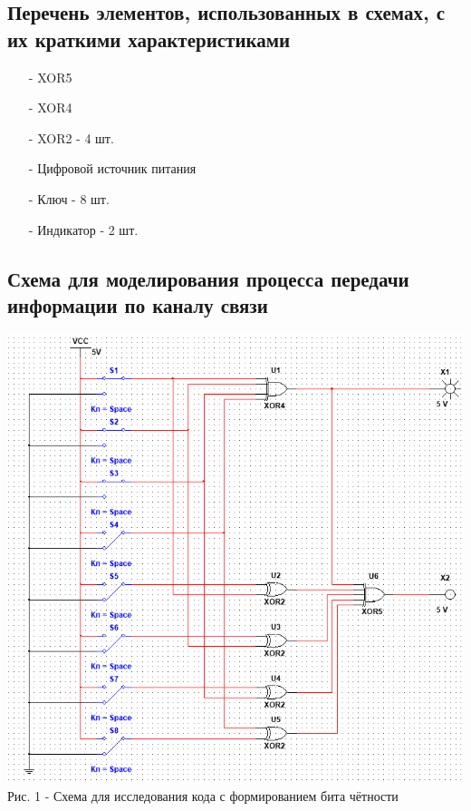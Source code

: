 \documentclass[11pt]{article}
\begin{document}
\subsection{ Перечень элементов, использованных в схемах, с их краткими характеристиками}
\begin{itemize}
    \item[-] XOR5 
    \item[-] XOR4
    \item[-] XOR2 - 4 шт.
    \item[-] Цифровой источник питания
    \item[-] Ключ - 8 шт.
    \item[-] Индикатор - 2 шт.
\end{itemize}
\subsection{Схема для моделирования процесса передачи информации по каналу связи}

\begin{center}
    \includegraphics[width=1\linewidth]{img/scheme1.png}
    Рис. 1 - Схема для исследования кода с формированием бита чётности
\end{center}
\end{document}
